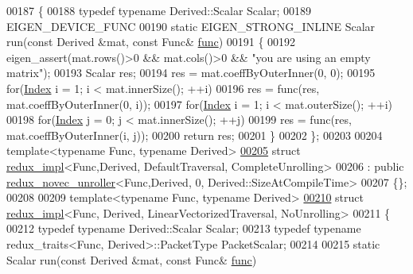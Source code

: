 \begin{DoxyCode}
00187 \{
00188   \textcolor{keyword}{typedef} \textcolor{keyword}{typename} Derived::Scalar Scalar;
00189   EIGEN\_DEVICE\_FUNC
00190   \textcolor{keyword}{static} EIGEN\_STRONG\_INLINE Scalar run(\textcolor{keyword}{const} Derived &mat, \textcolor{keyword}{const} Func& \hyperlink{structfunc}{func})
00191   \{
00192     eigen\_assert(mat.rows()>0 && mat.cols()>0 && \textcolor{stringliteral}{"you are using an empty matrix"});
00193     Scalar res;
00194     res = mat.coeffByOuterInner(0, 0);
00195     \textcolor{keywordflow}{for}(\hyperlink{namespace_eigen_a62e77e0933482dafde8fe197d9a2cfde}{Index} i = 1; i < mat.innerSize(); ++i)
00196       res = func(res, mat.coeffByOuterInner(0, i));
00197     \textcolor{keywordflow}{for}(\hyperlink{namespace_eigen_a62e77e0933482dafde8fe197d9a2cfde}{Index} i = 1; i < mat.outerSize(); ++i)
00198       \textcolor{keywordflow}{for}(\hyperlink{namespace_eigen_a62e77e0933482dafde8fe197d9a2cfde}{Index} j = 0; j < mat.innerSize(); ++j)
00199         res = func(res, mat.coeffByOuterInner(i, j));
00200     \textcolor{keywordflow}{return} res;
00201   \}
00202 \};
00203 
00204 \textcolor{keyword}{template}<\textcolor{keyword}{typename} Func, \textcolor{keyword}{typename} Derived>
\hyperlink{struct_eigen_1_1internal_1_1redux__impl_3_01_func_00_01_derived_00_01_default_traversal_00_01_complete_unrolling_01_4}{00205} \textcolor{keyword}{struct }\hyperlink{struct_eigen_1_1internal_1_1redux__impl}{redux\_impl}<Func,Derived, DefaultTraversal, CompleteUnrolling>
00206   : \textcolor{keyword}{public} \hyperlink{struct_eigen_1_1internal_1_1redux__novec__unroller}{redux\_novec\_unroller}<Func,Derived, 0, Derived::SizeAtCompileTime>
00207 \{\};
00208 
00209 \textcolor{keyword}{template}<\textcolor{keyword}{typename} Func, \textcolor{keyword}{typename} Derived>
\hyperlink{struct_eigen_1_1internal_1_1redux__impl_3_01_func_00_01_derived_00_01_linear_vectorized_traversal_00_01_no_unrolling_01_4}{00210} \textcolor{keyword}{struct }\hyperlink{struct_eigen_1_1internal_1_1redux__impl}{redux\_impl}<Func, Derived, LinearVectorizedTraversal, NoUnrolling>
00211 \{
00212   \textcolor{keyword}{typedef} \textcolor{keyword}{typename} Derived::Scalar Scalar;
00213   \textcolor{keyword}{typedef} \textcolor{keyword}{typename} redux\_traits<Func, Derived>::PacketType PacketScalar;
00214 
00215   \textcolor{keyword}{static} Scalar run(\textcolor{keyword}{const} Derived &mat, \textcolor{keyword}{const} Func& \hyperlink{structfunc}{func})

\end{DoxyCode}
